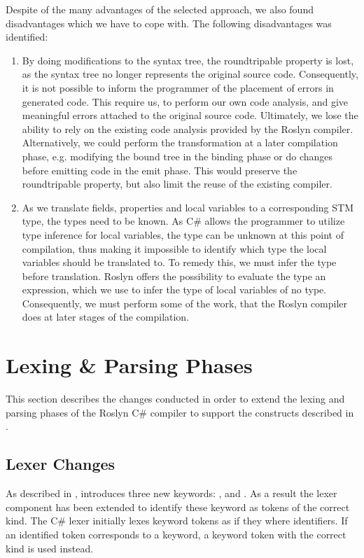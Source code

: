 Despite of the many advantages of the selected approach, we also found disadvantages which we have to cope with. The following disadvantages was identified:
\begin{enumerate}
	\item By doing modifications to the syntax tree, the roundtripable property is lost, as the syntax tree no longer represents the original source code. Consequently, it is not possible to inform the programmer of the placement of errors in generated code. This require us, to perform our own code analysis, and give meaningful errors attached to the original source code. Ultimately, we lose the ability to rely on the existing code analysis provided by the Roslyn compiler. Alternatively, we could perform the transformation at a later compilation phase, e.g. modifying the bound tree in the binding phase or do changes before emitting code in the emit phase. This would preserve the roundtripable property, but also limit the reuse of the existing compiler. 
	
	\item As we translate  fields, properties and local variables to a corresponding \ac{STM} type, the types need to be known. As C\# allows the programmer to utilize type inference for local variables, the type can be unknown at this point of compilation, thus making it impossible to identify which type the local variables should be translated to. To remedy this, we must infer the type before translation. Roslyn offers the possibility to evaluate the type an expression, which we use to infer the type of  local variables of no type. Consequently, we must perform some of the work, that the Roslyn compiler does at later stages of the compilation.
\end{enumerate}

\section{Lexing \& Parsing Phases}
This section describes the changes conducted in order to extend the lexing and parsing phases of the Roslyn C\# compiler to support the constructs described in .
\label{sec:roslyn_lexer_parser_changes}

\subsection{Lexer Changes}
As described in , \stmnamesp introduces three new keywords: ,  and . As a result the lexer component has been extended to identify these keyword as tokens of the correct kind. The C\# lexer initially lexes keyword tokens as if they where identifiers. If an identified token corresponds to a keyword, a keyword token with the correct kind is used instead. 


